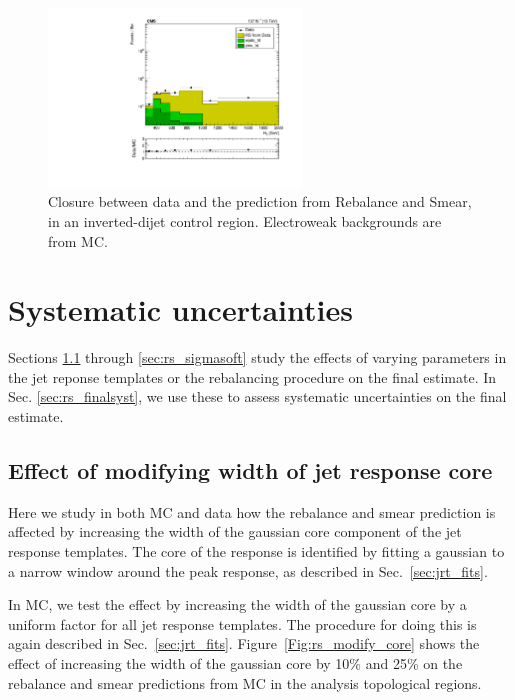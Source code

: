 \begin{figure}[htbp]
  \begin{center}
    \includegraphics[width=0.60\textwidth]{figs/qcd/rs_data/monojet/dataAll_crRSInvertDPhibaseJ_htbins.pdf}
    \caption{Closure between data and the prediction from Rebalance and Smear, in an inverted-\dphimet dijet
control region. Electroweak backgrounds are from MC.
            }
    \label{Fig:rs_monojet_data_validation}
  \end{center}
\end{figure}

\newpage
\section{Systematic uncertainties}
\label{sec:rs_systematics}

Sections \ref{sec:rs_jrt_core} through \ref{sec:rs_sigmasoft} study the effects of varying
parameters in the jet reponse templates or the rebalancing procedure on the final estimate.
In Sec. \ref{sec:rs_finalsyst}, we use these to assess systematic uncertainties on the final estimate.

\subsection{Effect of modifying width of jet response core}
\label{sec:rs_jrt_core}

Here we study in both MC and data how the rebalance and smear prediction is affected by increasing the width of the gaussian core component of the jet response templates. 
The core of the response is identified by fitting a gaussian to a narrow window around the peak response, as described in Sec.~\ref{sec:jrt_fits}.

In MC, we test the effect by increasing the width of the gaussian core by a uniform factor for all jet response templates. 
The procedure for doing this is again described in Sec.~\ref{sec:jrt_fits}. 
Figure~\ref{Fig:rs_modify_core} shows the effect of increasing the width of the gaussian core by 10\% and 25\% on the rebalance and smear predictions from MC in the 
analysis topological regions.


